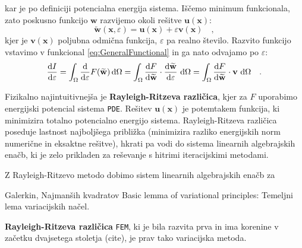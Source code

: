 kar je po definiciji potencialna energija sistema. Iščemo minimum funkcionala, zato poskusno funkcijo $\mathbf{w}$ razvijemo okoli rešitve $\mathbf{u}(\mathbf{x})$:
\begin{equation}
	\widetilde{\mathbf{w}}(\mathbf{x}, \varepsilon) = \mathbf{u}(\mathbf{x}) + \varepsilon \mathbf{v}(\mathbf{x}) \quad ,
\end{equation}
kjer je $\mathbf{v}(\mathbf{x})$ poljubna odmična funkcija, $\varepsilon$ pa realno število. Razvito funkcijo vstavimo v funkcional \eqref{eq:GeneralFunctional} in ga nato odvajamo po $\varepsilon$:
\begin{equation}
\frac{\mathrm{d} I}{\mathrm{d} \varepsilon} = \int_{\Omega} \frac{\mathrm{d}}{\mathrm{d} \varepsilon} F(\widetilde{\mathbf{w}}) \, \mathrm{d} \Omega = \int_{\Omega} \frac{\mathrm{d} F}{\mathrm{d} \widetilde{\mathbf{w}}} \cdot \frac{\mathrm{d} \widetilde{\mathbf{w}}}{\mathrm{d} \varepsilon} \ \mathrm{d} \Omega = \int_{\Omega} \frac{\mathrm{d} F}{\mathrm{d} \widetilde{\mathbf{w}}} \cdot \mathbf{v} \ \mathrm{d} \Omega \quad .
\end{equation}

Fizikalno najintuitivnejša je \textbf{Rayleigh-Ritzeva različica}, kjer za $F$ uporabimo energijski potencial sistema \texttt{PDE}. Rešitev $\mathbf{u}(\mathbf{x})$ je potemtakem funkcija, ki minimizira totalno potencialno energijo sistema. Rayleigh-Ritzeva različica poseduje lastnost najboljšega približka (minimizira razliko energijskih norm numerične in eksaktne rešitve), hkrati pa vodi do sistema linearnih algebrajskih enačb, ki je zelo prikladen za reševanje s hitrimi iteracijskimi metodami.

Z Rayleigh-Ritzevo metodo dobimo sistem linearnih algebrajskih enačb za 

Galerkin, Najmanših kvadratov \cite{JiangB-LSFEM}
Basic lemma of variational principles: Temeljni lema variacijskih načel.

\textbf{Rayleigh-Ritzeva različica} \texttt{FEM}, ki je bila razvita prva in ima korenine v začetku dvajsetega stoletja (cite), je prav tako variacijska metoda.